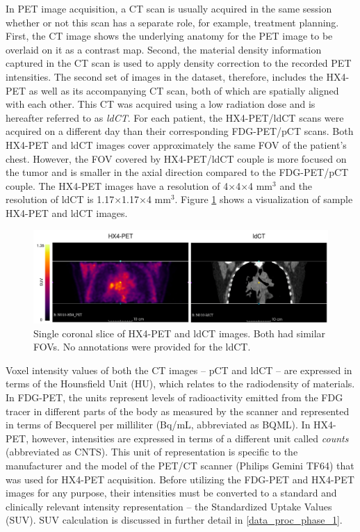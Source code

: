 In PET image acquisition, a CT scan is usually acquired in the same session whether or not this scan has a separate role, for example, treatment planning. First, the CT image shows the underlying anatomy for the PET image to be overlaid on it as a contrast map. Second, the material density information captured in the CT scan is used to apply density correction to the recorded PET intensities. The second set of images in the dataset, therefore, includes the HX4-PET as well as its accompanying CT scan, both of which are spatially aligned with each other. This CT was acquired using a low radiation dose and is hereafter referred to as \textit{ldCT}. For each patient, the HX4-PET/ldCT scans were acquired on a different day than their corresponding FDG-PET/pCT scans. Both HX4-PET and ldCT images cover approximately the same FOV of the patient's chest. However, the FOV covered by HX4-PET/ldCT couple is more focused on the tumor and is smaller in the axial direction compared to the FDG-PET/pCT couple. The HX4-PET images have a resolution of 4$\times$4$\times$4 mm$^3$ and the resolution of ldCT is 1.17$\times$1.17$\times$4 mm$^3$. Figure \ref{fig:original_hx4pet_ldct} shows a visualization of sample HX4-PET and ldCT images.

\begin{figure}[h!]
    \centering
    \includegraphics[width=\linewidth]{figures/Data/original/N010-HX4_PET_ldCT.png}
    \caption{Single coronal slice of HX4-PET and ldCT images. Both had similar FOVs. No annotations were provided for the ldCT.}
    \label{fig:original_hx4pet_ldct}
\end{figure}

Voxel intensity values of both the CT images -- pCT and ldCT -- are expressed in terms of the Hounsfield Unit (HU), which relates to the radiodensity of materials. In FDG-PET, the units represent levels of radioactivity emitted from the FDG tracer in different parts of the body as measured by the scanner and represented in terms of Becquerel per milliliter (Bq/mL, abbreviated as BQML). In HX4-PET, however, intensities are expressed in terms of a different unit called \textit{counts} (abbreviated as CNTS). This unit of representation is specific to the manufacturer and the model of the PET/CT scanner (Philips Gemini TF64) that was used for HX4-PET acquisition. Before utilizing the FDG-PET and HX4-PET images for any purpose, their intensities must be converted to a standard and clinically relevant intensity representation -- the Standardized Uptake Values (SUV). SUV calculation is discussed in further detail in \ref{data_proc_phase_1}.


